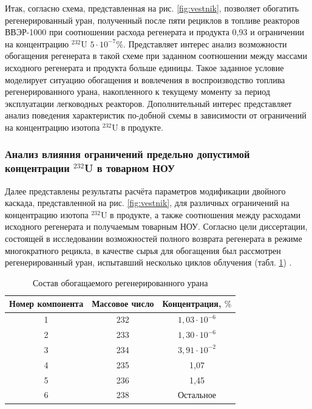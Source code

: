 Итак, согласно \cite{smirnovObogashchenieRegenerirovannogoUrana2018} схема, представленная на рис. \ref{fig:vestnik}, позволяет обогатить регенерированный уран, полученный после пяти рециклов в топливе реакторов ВВЭР-1000 при соотношении расхода регенерата и продукта 0,93 и ограничении на концентрацию $^{232}$U $5\cdot10^{-7}$\%. Представляет интерес анализ возможности обогащения регенерата в такой схеме при заданном соотношении между массами исходного регенерата и продукта больше единицы. Такое заданное условие моделирует ситуацию обогащения и вовлечения в воспроизводство топлива регенерированного урана, накопленного к текущему моменту за период эксплуатации легководных реакторов. Дополнительный интерес представляет анализ поведения характеристик по-добной схемы в зависимости от ограничений на концентрацию изотопа $^{232}$U в продукте. 

\subsubsection{Анализ влияния ограничений предельно допустимой концентрации $^{232}$U в товарном НОУ}

Далее представлены результаты расчёта параметров модификации двойного каскада, представленной на рис. \ref{fig:vestnik}, для различных ограничений на концентрацию изотопа $^{232}$U в продукте, а также соотношения между расходами исходного регенерата и получаемым товарным НОУ.
Согласно цели диссертации, состоящей в исследовании возможностей полного возврата регенерата в режиме многократного рецикла, в качестве сырья для обогащения был рассмотрен регенерированный уран, испытавший несколько циклов облучения (табл. \ref{RepU_fifth}) \cite{palkinDesignanalyticalResearchRefinement2010}.

\begin{table}
  \begin{tabular}{c|c|c} 
  \hline
  Номер компонента & Массовое число & Концентрация, $\%$ \\
  \hline 1 & 232 & $1,03 \cdot 10^{-6}$ \\
  2 & 233 & $1,30 \cdot 10^{-6}$ \\
  3 & 234 & $3,91 \cdot 10^{-2}$ \\
  4 & 235 & 1,07 \\
  5 & 236 & 1,45 \\
  6 & 238 & Остальное \\
  \hline
  \end{tabular}
\caption{Состав обогащаемого регенерированного урана}\label{RepU_fifth}
\end{table}

